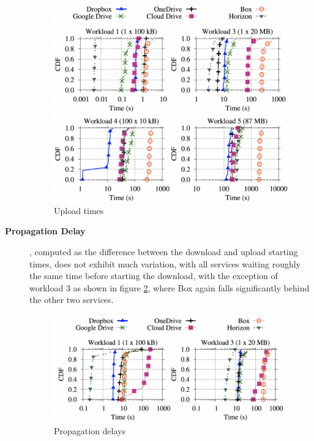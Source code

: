 \begin{description}
    \begin{figure} [h]
        \centering
        \includegraphics[scale=0.7]{images/upload_times}
        \caption{\label{fig:upload}Upload times}
    \end{figure}

    \item[\textbf{Propagation Delay}], computed as the difference between the download and upload starting times,  does not exhibit much variation, with all services waiting roughly the same time before starting the download, with the exception of workload 3 as shown in figure \ref{fig:propagation delay}, where Box again falls significantly behind the other two services.

    \begin{figure} [h]
        \centering
        \includegraphics[scale=0.7]{images/propagation_delay}
        \caption{\label{fig:propagation delay}Propagation delays}
    \end{figure}


\end{description}
